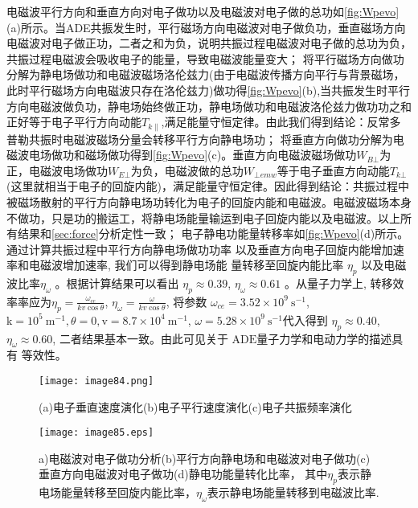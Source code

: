 电磁波平行方向和垂直方向对电子做功以及电磁波对电子做的总功如\autoref{fig:Wpevo}(a)所示。当ADE共振发生时，平行磁场方向电磁波对电子做负功，垂直磁场方向电磁波对电子做正功，二者之和为负，说明共振过程电磁波对电子做的总功为负，共振过程电磁波会吸收电子的能量，导致电磁波能量变大；
将平行磁场方向做功分解为静电场做功和电磁波磁场洛伦兹力(由于电磁波传播方向平行与背景磁场，此时平行磁场方向电磁波只存在洛伦兹力)做功得\autoref{fig:Wpevo}(b),当共振发生时平行方向电磁波做负功，静电场始终做正功，静电场做功和电磁波洛伦兹力做功功之和正好等于电子平行方向动能$T_{k∥}$,满足能量守恒定律。由此我们得到结论：反常多普勒共振时电磁波磁场分量会转移平行方向静电场功；
将垂直方向做功分解为电磁波电场做功和磁场做功得到\autoref{fig:Wpevo}(c)。垂直方向电磁波磁场做功$W_{B⊥}$为正，电磁波电场做功$W_{E⊥}$为负，电磁波做的总功$W_{⊥emw}$等于电子垂直方向动能$T_{k⊥}$(这里就相当于电子的回旋内能)，满足能量守恒定律。因此得到结论：共振过程中被磁场散射的平行方向静电场功转化为电子的回旋内能和电磁波。电磁波磁场本身不做功，只是功的搬运工，将静电场能量输运到电子回旋内能以及电磁波。以上所有结果和\autoref{sec:force}分析定性一致；
电子静电功能量转移率如\autoref{fig:Wpevo}(d)所示。通过计算共振过程中平行方向静电场做功功率 以及垂直方向电子回旋内能增加速率和电磁波增加速率, 我们可以得到静电场能 量转移至回旋内能比率 $ \eta_{p}$  以及电磁波比率$  \eta_{\omega}$ 。根据计算结果可以看出 $ \eta_{p} \approx 0.39 $, $ \eta_{\omega} \approx 0.61 $ 。从量子力学上, 转移效率率应为$  \eta_{p}=\frac{\omega_{c e}}{k v \cos \theta}$, $\eta_{\omega}=\frac{\omega}{k v\cos \theta}$, 将参数 $ \omega_{c e}=   3.52 \times 10^{9} ~ \mathrm{s^{-1}}$, $\mathrm{k}=10^{5} ~ \mathrm{m^{-1}}, \theta=0, \mathrm{v}=8.7 \times 10^{4}  ~\mathrm{m^{-1}}$, $\omega=5.28 \times 10^{9} ~\mathrm{s^{-1}} $代入得到  $\eta_{p} \approx 0.40$, $\eta_{\omega} \approx  0.60 $, 二者结果基本一致。由此可见关于  $\mathrm{ADE}  $量子力学和电动力学的描述具有 等效性。
\clearpage
\begin{figure}
\centering
\texttt{[image: image84.png]}
\caption{\label{fig:vtevo}(a)电子垂直速度演化(b)电子平行速度演化(c)电子共振频率演化}
\end{figure}
\begin{figure}
\centering
\texttt{[image: image85.eps]}
\caption{\label{fig:Wpevo}a)电磁波对电子做功分析(b)平行方向静电场和电磁波对电子做功(c)垂直方向电磁波对电子做功(d)静电功能量转化比率，
其中$\eta_p$表示静电场能量转移至回旋内能比率，$\eta_\omega$表示静电场能量转移到电磁波比率.}
\end{figure}
\clearpage
